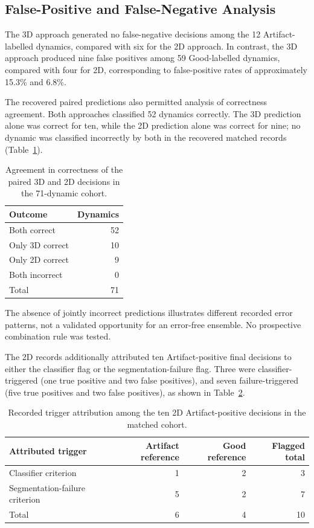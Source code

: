 \subsection{False-Positive and False-Negative Analysis}
\label{subsec:results_matched_pipeline_errors}

The 3D approach generated no false-negative decisions among the 12 Artifact-labelled dynamics, compared with six for the 2D approach. In contrast, the 3D approach produced nine false positives among 59 Good-labelled dynamics, compared with four for 2D, corresponding to false-positive rates of approximately 15.3\% and 6.8\%.

The recovered paired predictions also permitted analysis of correctness agreement. Both approaches classified 52 dynamics correctly. The 3D prediction alone was correct for ten, while the 2D prediction alone was correct for nine; no dynamic was classified incorrectly by both in the recovered matched records (Table~\ref{tab:results_matched_correctness_agreement}).

\begin{table}[htbp]
\centering
\caption{Agreement in correctness of the paired 3D and 2D decisions in the 71-dynamic cohort.}
\label{tab:results_matched_correctness_agreement}
\begin{tabular}{lr}
\hline
Outcome & Dynamics \\
\hline
Both correct & 52 \\
Only 3D correct & 10 \\
Only 2D correct & 9 \\
Both incorrect & 0 \\
\hline
Total & 71 \\
\hline
\end{tabular}
\end{table}

The absence of jointly incorrect predictions illustrates different recorded error patterns, not a validated opportunity for an error-free ensemble. No prospective combination rule was tested.

The 2D records additionally attributed ten Artifact-positive final decisions to either the classifier flag or the segmentation-failure flag. Three were classifier-triggered (one true positive and two false positives), and seven failure-triggered (five true positives and two false positives), as shown in Table~\ref{tab:results_matched_2d_triggers}.

\begin{table}[htbp]
\centering
\caption{Recorded trigger attribution among the ten 2D Artifact-positive decisions in the matched cohort.}
\label{tab:results_matched_2d_triggers}
\begin{tabular}{lrrr}
\hline
Attributed trigger & Artifact reference & Good reference & Flagged total \\
\hline
Classifier criterion & 1 & 2 & 3 \\
Segmentation-failure criterion & 5 & 2 & 7 \\
\hline
Total & 6 & 4 & 10 \\
\hline
\end{tabular}
\end{table}

